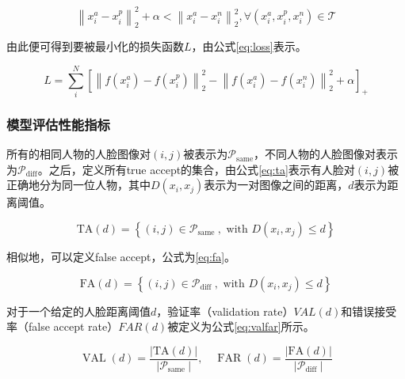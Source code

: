 \begin{equation}
    \left\|x_{i}^{a}-x_{i}^{p}\right\|_{2}^{2}+\alpha<\left\|x_{i}^{a}-x_{i}^{n}\right\|_{2}^{2}, \forall\left(x_{i}^{a}, x_{i}^{p}, x_{i}^{n}\right) \in \mathcal{T}
    \label{eq:tpltll}
\end{equation}

由此便可得到要被最小化的损失函数$L$，由公式\ref{eq:loss}表示。

\begin{equation}
    L=\sum_{i}^{N}\left[\left\|f\left(x_{i}^{a}\right)-f\left(x_{i}^{p}\right)\right\|_{2}^{2}-\left\|f\left(x_{i}^{a}\right)-f\left(x_{i}^{n}\right)\right\|_{2}^{2}+\alpha\right]_{+}
    \label{eq:loss}
\end{equation}

\subsubsection{模型评估性能指标}

所有的相同人物的人脸图像对$(i,j)$被表示为$\mathcal{P}_{\text {same}}$，不同人物的人脸图像对表示为$\mathcal{P}_{\text {diff}}$。之后，定义所有true accept的集合，由公式\ref{eq:ta}表示有人脸对$(i,j)$被正确地分为同一位人物，其中$D\left(x_{i}, x_{j}\right)$表示为一对图像之间的距离，$d$表示为距离阈值。

\begin{equation}
    \mathrm{TA}(d)=\left\{(i, j) \in \mathcal{P}_{\text {same }}, \text { with } D\left(x_{i}, x_{j}\right) \leq d\right\}
    \label{eq:ta}
\end{equation}

相似地，可以定义false accept，公式为\ref{eq:fa}。

\begin{equation}
    \mathrm{FA}(d)=\left\{(i, j) \in \mathcal{P}_{\text {diff }}, \text { with } D\left(x_{i}, x_{j}\right) \leq d\right\}
    \label{eq:fa}
\end{equation}

对于一个给定的人脸距离阈值$d$，验证率（validation rate）$VAL(d)$和错误接受率（false accept rate）$FAR(d)$被定义为公式\ref{eq:valfar}所示。

\begin{equation}
    \operatorname{VAL}(d)=\frac{|\mathrm{TA}(d)|}{\left|\mathcal{P}_{\text {same }}\right|}, \quad \operatorname{FAR}(d)=\frac{|\mathrm{FA}(d)|}{\left|\mathcal{P}_{\text {diff }}\right|}
    \label{eq:valfar}
\end{equation}